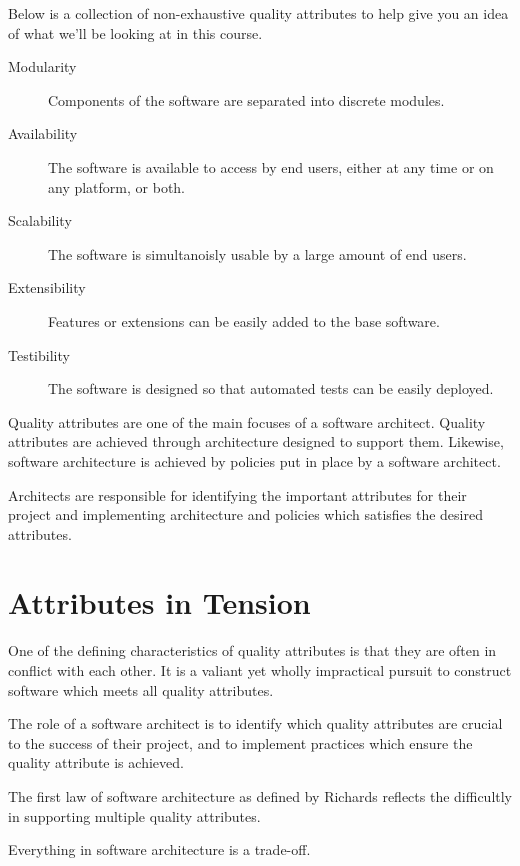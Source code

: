 Below is a collection of non-exhaustive quality attributes to help give you an idea of what we'll be looking at in this course.

\begin{description}
    \item[Modularity] Components of the software are separated into discrete modules.
    \item[Availability] The software is available to access by end users, either at any time or on any platform, or both.
    \item[Scalability] The software is simultanoisly usable by a large amount of end users.
    \item[Extensibility] Features or extensions can be easily added to the base software.
    \item[Testibility] The software is designed so that automated tests can be easily deployed.
\end{description}

Quality attributes are one of the main focuses of a software architect.
Quality attributes are achieved through architecture designed to support them.
Likewise, software architecture is achieved by policies put in place by a software architect.

Architects are responsible for identifying the important attributes for their project
and implementing architecture and policies which satisfies the desired attributes.

\section{Attributes in Tension}
One of the defining characteristics of quality attributes is that they are often in conflict with each other.
It is a valiant yet wholly impractical pursuit to construct software which meets all quality attributes.

The role of a software architect is to identify which quality attributes are crucial to the success of their project,
and to implement practices which ensure the quality attribute is achieved.

The first law of software architecture as defined by Richards \cite{richards2020fundamentals} reflects the difficultly in supporting multiple quality attributes.

\begin{definition}
Everything in software architecture is a trade-off.
\end{definition}

